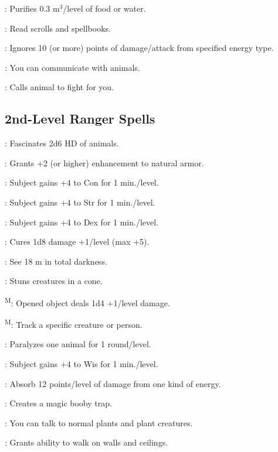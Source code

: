 : Purifies 0.3 m$^3$/level of food or water.

: Read scrolls and spellbooks.

: Ignores 10 (or more) points of damage/attack from specified energy type.

: You can communicate with animals.

: Calls animal to fight for you.



\subsection{2nd-Level Ranger Spells}

: Fascinates 2d6 HD of animals.

: Grants +2 (or higher) enhancement to natural armor.

: Subject gains +4 to Con for 1 min./level.

: Subject gains +4 to Str for 1 min./level.

: Subject gains +4 to Dex for 1 min./level.

: Cures 1d8 damage +1/level (max +5).

: See 18 m in total darkness.

: Stuns creatures in a cone. %

\textsuperscript{M}: Opened object deals 1d4 +1/level damage.

\textsuperscript{M}: Track a specific creature or person. %

: Paralyzes one animal for 1 round/level.

: Subject gains +4 to Wis for 1 min./level.

: Absorb 12 points/level of damage from one kind of energy.

: Creates a magic booby trap.

: You can talk to normal plants and plant creatures.

: Grants ability to walk on walls and ceilings.

